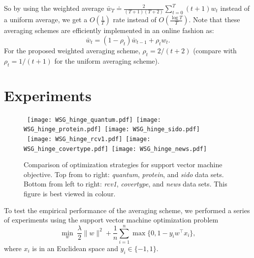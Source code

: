 \documentclass[11pt]{article}
\begin{document}
So by using the weighted average $\bar{w}_T \doteq \frac{2}{(T+1)(T+2)}\sum_{t=0}^T (t+1) w_t$ instead of a uniform average, we get a $O(\frac{1}{T})$ rate instead of $O(\frac{\log T}{T})$. Note that these averaging schemes are efficiently implemented in an online fashion as:
\begin{equation} \label{eq:wavg}
\bar{w}_t = (1-\rho_t) \bar{w}_{t-1}  + \rho_t w_t .
\end{equation}
For the proposed weighted averaging scheme, $\rho_t = 2/(t+2)$ (compare with $\rho_t = 1/(t+1)$ for the uniform averaging scheme).
 
 \section{Experiments}
 

\begin{figure}
\centering
\mbox{%
\texttt{[image: WSG\_hinge\_quantum.pdf]} \hspace*{-.1cm}
\texttt{[image: WSG\_hinge\_protein.pdf]} \hspace*{-.1cm}
\texttt{[image: WSG\_hinge\_sido.pdf]} \hspace*{-.1cm}}
\mbox{%
\texttt{[image: WSG\_hinge\_rcv1.pdf]} \hspace*{-.1cm}
\texttt{[image: WSG\_hinge\_covertype.pdf]} \hspace*{-.1cm}
\texttt{[image: WSG\_hinge\_news.pdf]} \hspace*{-.1cm}}
\caption{Comparison of optimization strategies for support vector machine objective. Top from to right: \emph{quantum}, \emph{protein}, and \emph{sido} data sets. Bottom from left to right: \emph{rcv1}, \emph{covertype}, and \emph{news} data sets. This figure is best viewed in colour.}
\label{fig:svm}
\end{figure} 
 
To test the empirical performance of the averaging scheme, we performed a series of experiments using the support vector machine optimization problem
\[
\min_w \; \frac{\lambda}{2}\|w\|^2 + \frac{1}{n}\sum_{i=1}^n \max\{0,1-y_iw^\top x_i\},
\]
where $x_i$ is in an Euclidean space and $y_i \in \{-1,1\}$.
\end{document}
